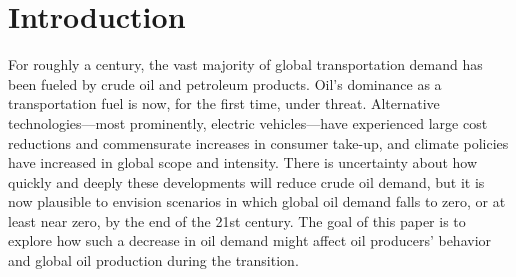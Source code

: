 \documentclass[12pt]{article}
\begin{document}

\newpage


\onehalfspacing




\section{Introduction}

For roughly a century, the vast majority of global transportation demand has been fueled by crude oil and petroleum products. Oil's dominance as a transportation fuel is now, for the first time, under threat. Alternative technologies---most prominently, electric vehicles---have experienced large cost reductions and commensurate increases in consumer take-up, and climate policies have increased in global scope and intensity. There is uncertainty about how quickly and deeply these developments will reduce crude oil demand, but it is now plausible to envision scenarios in which global oil demand falls to zero, or at least near zero, by the end of the 21st century. The goal of this paper is to explore how such a decrease in oil demand might affect oil producers' behavior and global oil production during the transition.
\end{document}
